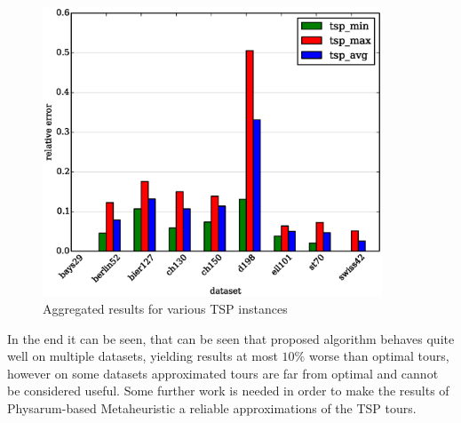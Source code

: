 \documentclass[english,a4paper,twoside]{ppfcmthesis}
\begin{document}
\begin{figure}
  \centering

  \includegraphics[width=0.9\textwidth]{algorithm/metaheuristic/charts/tsp/final/distance.eps}

  \caption{Aggregated results for various TSP instances}
  \label{figure:tsp_final}
\end{figure}

In the end it can be seen, that can be seen that proposed algorithm behaves quite well on multiple datasets, yielding results at most $10\%$ worse than optimal tours, however on some datasets approximated tours are far from optimal and cannot be considered useful. Some further work is needed in order to make the results of Physarum-based Metaheuristic a reliable approximations of the TSP tours.

{\raggedright\sloppy\small}

\cleardoublepage\ppcolophon
\end{document}
